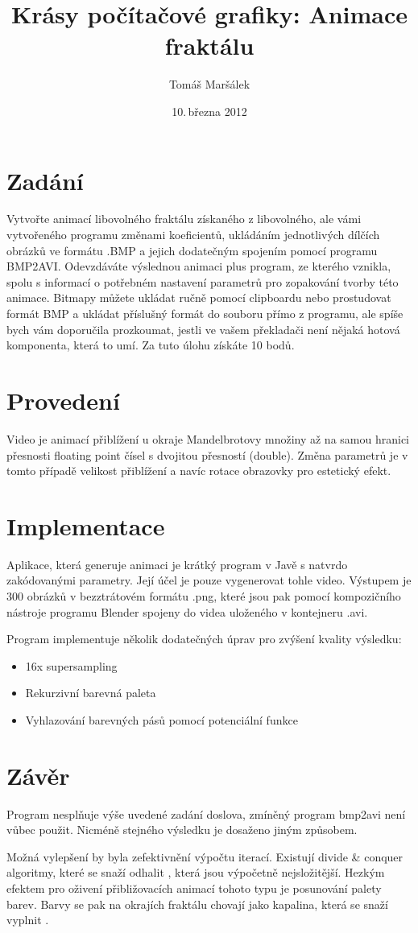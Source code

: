 \documentclass[11pt]{article}
\title{Krásy počítačové grafiky: Animace fraktálu}
\author{Tomáš Maršálek}
\date{10.\,března 2012}
\begin{document}
\maketitle
\section{Zadání}
Vytvořte animací libovolného fraktálu získaného z libovolného, ale vámi
vytvořeného programu změnami koeficientů, ukládáním jednotlivých dílčích
obrázků ve formátu .BMP a jejich dodatečným spojením pomocí programu BMP2AVI.
Odevzdáváte výslednou animaci plus program, ze kterého vznikla, spolu s
informací o potřebném nastavení parametrů pro zopakování tvorby této animace.
Bitmapy můžete ukládat ručně pomocí clipboardu nebo prostudovat formát BMP a
ukládat příslušný formát do souboru přímo z programu, ale spíše bych vám
doporučila prozkoumat, jestli ve vašem překladači není nějaká hotová
komponenta, která to umí. Za tuto úlohu získáte 10 bodů.

\section{Provedení}
Video je animací přiblížení u okraje Mandelbrotovy množiny až na samou hranici
přesnosti floating point čísel s dvojitou přesností (double). Změna parametrů
je v tomto případě velikost přiblížení a navíc rotace obrazovky pro estetický
efekt.

\section{Implementace}
Aplikace, která generuje animaci je krátký program v Javě s natvrdo
zakódovanými parametry. Její účel je pouze vygenerovat tohle video. Výstupem je
300 obrázků v bezztrátovém formátu .png, které jsou pak pomocí kompozičního
nástroje programu Blender spojeny do videa uloženého v kontejneru .avi.

Program implementuje několik dodatečných úprav pro zvýšení kvality výsledku:
\begin{itemize}
\item 16x supersampling
\item Rekurzivní barevná paleta
\item Vyhlazování barevných pásů pomocí potenciální funkce
\end{itemize}

\section{Závěr}
Program nesplňuje výše uvedené zadání doslova, zmíněný program bmp2avi není vůbec použit. Nicméně stejného výsledku je dosaženo jiným způsobem.

Možná vylepšení by byla zefektivnění výpočtu iterací. Existují divide \& conquer algoritmy, které se snaží odhalit , která jsou výpočetně nejsložitější. Hezkým efektem pro oživení přibližovacích animací tohoto typu je posunování palety barev. Barvy se pak na okrajích fraktálu chovají jako kapalina, která se snaží vyplnit .
\end{document}
